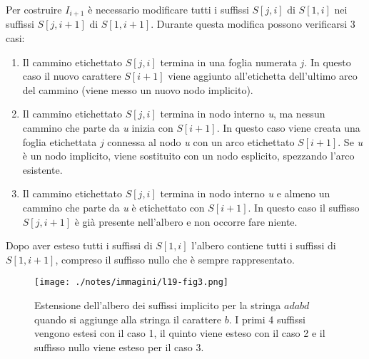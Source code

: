 Per costruire $ I_{i+1} $ è necessario modificare tutti i suffissi $ S[j,i] $ di $ S[1,i] $ nei suffissi $ S[j,i+1] $ di $ S[1,i+1] $.
Durante questa modifica possono verificarsi 3 casi:

\begin{enumerate}
	\item Il cammino etichettato $ S[j,i] $ termina in una foglia numerata $ j $. In questo caso il nuovo carattere $ S[i+1] $ viene aggiunto all'etichetta dell'ultimo arco del cammino (viene messo un nuovo nodo implicito).
	\item Il cammino etichettato $ S[j,i] $ termina in nodo interno \textit{u}, ma nessun cammino che parte da \textit{u} inizia con $ S[i+1] $. In questo caso viene creata una foglia etichettata $ j $ connessa al nodo \textit{u} con un arco etichettato $ S[i+1] $. Se \textit{u} è un nodo implicito, viene sostituito con un nodo esplicito, spezzando l'arco esistente.
	\item Il cammino etichettato $ S[j,i] $ termina in nodo interno \textit{u} e almeno un cammino che parte da \textit{u} è etichettato con $ S[i+1] $. In questo caso il suffisso $ S[j,i+1] $ è già presente nell'albero e non occorre fare niente.
\end{enumerate}

Dopo aver esteso tutti i suffissi di $ S[1,i] $ l'albero contiene tutti i suffissi di $ S[1,i+1] $, compreso il suffisso nullo che è sempre rappresentato.

\begin{figure}[htbp]
	\centering
	\texttt{[image: ./notes/immagini/l19-fig3.png]}
	\caption{Estensione dell'albero dei suffissi implicito per la stringa $ adabd $ quando si aggiunge alla stringa il carattere $ b $. I primi 4 suffissi vengono estesi con il caso 1, il quinto viene esteso con il caso 2 e il suffisso nullo viene esteso per il caso 3.}
\end{figure}


